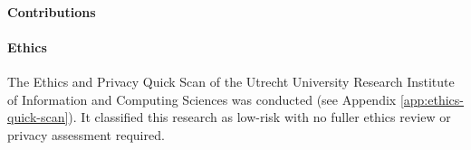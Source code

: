 \paragraph{Contributions}

\paragraph{Ethics}
The Ethics and Privacy Quick Scan of the Utrecht University Research Institute of Information and Computing Sciences was conducted (see Appendix \ref{app:ethics-quick-scan}).
It classified this research as low-risk with no fuller ethics review or privacy assessment required.

